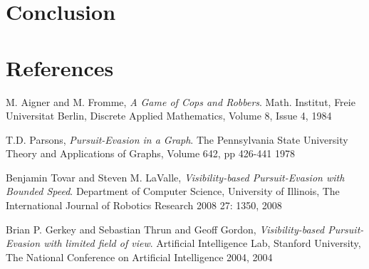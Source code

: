 \documentclass{article}
\begin{document}
\section{Conclusion}

\section{References}

\begin{thebibliography}{9}

  M. Aigner and M. Fromme,
  \emph{A Game of Cops and Robbers}.
  Math. Institut, Freie Universitat Berlin,
  Discrete Applied Mathematics, Volume 8, Issue 4,
  1984
  
  T.D. Parsons,
  \emph{Pursuit-Evasion in a Graph}.
  The Pennsylvania State University
  Theory and Applications of Graphs, Volume 642, pp 426-441
  1978
  
  Benjamin Tovar and Steven M. LaValle,
  \emph{Visibility-based Pursuit-Evasion with Bounded Speed}.
  Department of Computer Science, University of Illinois,
  The International Journal of Robotics Research 2008 27: 1350,
  2008
  
  Brian P. Gerkey and Sebastian Thrun and Geoff Gordon,
  \emph{Visibility-based Pursuit-Evasion with limited field of view}.
  Artificial Intelligence Lab, Stanford University,
  The National Conference on Artificial Intelligence 2004,
  2004

\end{thebibliography}
\end{document}
